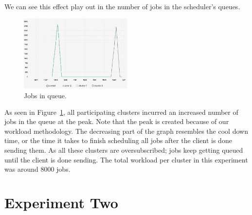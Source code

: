 We can see this effect play out in the number of jobs in the scheduler's queues.
\begin{figure}[H]
  \begin{center}
    \includegraphics[width=0.5\textwidth]{./figures/experiment-one/jobs-in-queue.png}
  \end{center}
  \caption{Jobs in queue.}
  \label{fig:exp-1-jobs-in-queue}
\end{figure}

As seen in Figure~\ref{fig:exp-1-jobs-in-queue}, all participating
clusters incurred an increased number of jobs in the queue at the peak. Note
that the peak is created because of our workload methodology. The decreasing
part of the graph resembles the cool down time, or the time it takes to finish
scheduling all jobs after the client is done sending them. As all these clusters
are oversubscribed; jobs keep getting queued until the client is done 
sending. The total workload per cluster in this experiment was around 8000
jobs. 

\section{Experiment Two}
\vspace{2em}
\begin{center}
\end{center}


